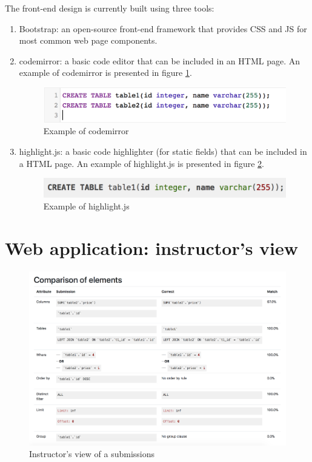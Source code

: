The front-end design is currently built using three tools:
\begin{enumerate}
    \item Bootstrap: an open-source front-end framework that provides CSS and JS for most common web page components.
    \item codemirror: a basic code editor that can be included in an HTML page. An example of codemirror is presented in figure \ref{fig:codemirror}.
\begin{figure}[H]
    \centering
    \includegraphics[width=\textwidth]{Chapters/5-Implementation/codemirror.png}
    \caption{Example of codemirror}
    \label{fig:codemirror}
\end{figure}
    \item  highlight.js: a basic code highlighter (for static fields) that can be included in a HTML page. An example of highlight.js is presented in figure \ref{fig:highlightjs}.
\begin{figure}[H]
    \centering
    \includegraphics[width=\textwidth]{Chapters/5-Implementation/higlightjs.png}
    \caption{Example of highlight.js}
    \label{fig:highlightjs}
\end{figure}
\end{enumerate}

\section{Web application: instructor's view}

\begin{figure}[H]
    \centering
    \includegraphics[width=\textwidth]{Chapters/4-Design/components.png}
    \caption{Instructor's view of a submissions}
    \label{fig:instructors_view}
\end{figure}

